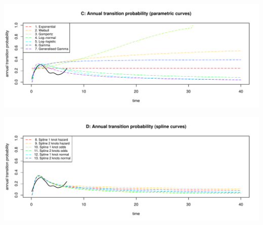 \documentclass[]{article}
\begin{document}
\begin{flushleft}\includegraphics[height=0.29\textheight]{images/validate_extrapolation3-3} \end{flushleft}

\begin{flushleft}\includegraphics[height=0.29\textheight]{images/validate_extrapolation3-4} \end{flushleft}
\end{document}
